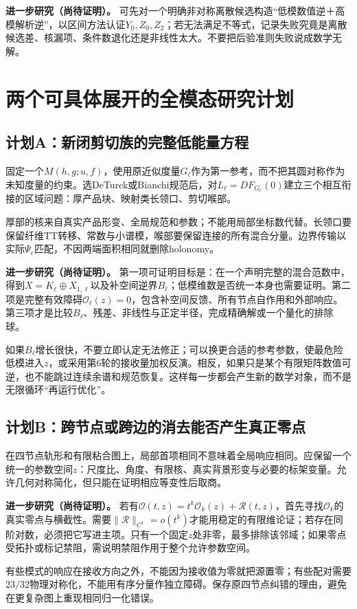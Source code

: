 \documentclass[UTF8,fontset=fandol,zihao=-4]{ctexart}
\theoremstyle{cn}
\newcommand{\newidea}{\par\noindent\textbf{进一步研究（尚待证明）。}}
\begin{document}
\newidea
可先对一个明确非对称离散候选构造“低模数值逆＋高模解析逆”，以区间方法认证$Y_0,Z_0,Z_2$；若无法满足不等式，记录失败究竟是离散候选差、核漏项、条件数退化还是非线性太大。不要把后验准则失败说成数学无解。

\section{两个可具体展开的全模态研究计划}
\subsection{计划A：新闭剪切族的完整低能量方程}
固定一个$M(h,g;u,f)$，使用原近似度量$G_\ell$作为第一参考，而不把其圆对称作为未知度量的约束。选DeTurck或Bianchi规范后，对$L_\ell=DF_{G_\ell}(0)$建立三个相互衔接的区域问题：厚产品块、映射类长领口、剪切喉部。

厚部的核来自真实产品形变、全局规范和参数；不能用局部坐标数代替。长领口要保留纤维TT转移、常数与小谱模，喉部要保留连接的所有混合分量。边界传输以实际$\Psi_e$匹配，不因两端面积相同就删除holonomy。

\newidea
第一项可证明目标是：在一个声明完整的混合范数中，得到$X=K_\ell\oplus X_{1,\ell}$以及补空间逆界$B_\ell$；低模维数是否统一本身也需要证明。第二项是完整有效障碍$\mathcal O_\ell(z)=0$，包含补空间反馈、所有节点自作用和外部响应。第三项才是比较$B_\ell$、残差、非线性与正定半径，完成精确解或一个量化的排除球。

如果$B_\ell$增长很快，不要立即认定无法修正；可以换更合适的参考参数，使最危险低模进入$z$，或采用第6轮的接收量加权反演。相反，如果只是某个有限矩阵数值可逆，也不能跳过连续余谱和规范恢复。这样每一步都会产生新的数学对象，而不是无限循环“再运行优化”。

\subsection{计划B：跨节点或跨边的消去能否产生真正零点}
在四节点轨形和有限粘合图上，局部首项相同不意味着全局响应相同。应保留一个统一的参数空间$z$：尺度比、角度、有限核、真实背景形变与必要的标架变量。允许几何对称简化，但只能在证明相应等变性后取商。

\newidea
若有$\mathcal O(t,z)=t^k\mathcal O_k(z)+\mathcal R(t,z)$，首先寻找$\mathcal O_k$的真实零点与横截性。需要$\|\mathcal R\|_{C^1}=o(t^k)$才能用稳定的有限维论证；若存在同阶对数，必须把它写进主项。只有一个固定$z$处非零，最多排除该邻域；如果零点受拓扑或标记禁阻，需说明禁阻作用于整个允许参数空间。

有些模式的响应在接收方向之外，不能因为接收值为零就把源置零；有些配对需要$23/32$物理对称化，不能用有序分量作独立障碍。保存原四节点纠错的理由，避免在更复杂图上重现相同归一化错误。
\end{document}
